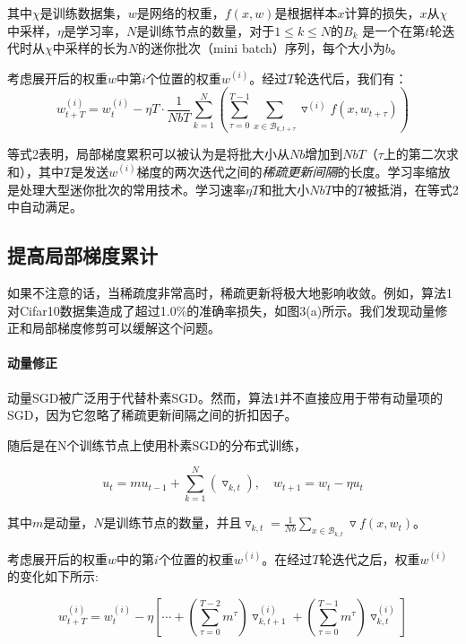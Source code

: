 其中$\chi$是训练数据集，$w$是网络的权重，$f(x,w)$是根据样本$x$计算的损失，$x$从$\chi$中采样，$\eta$是学习率，$N$是训练节点的数量，对于$1 \leq k \le N$的$B_k$ 是一个在第$t$轮迭代时从$\chi$中采样的长为$N$的迷你批次（mini batch）序列，每个大小为$b$。

考虑展开后的权重$w$中第$i$个位置的权重$w^{(i)}$。经过$T$轮迭代后，我们有：
\begin{equation}
	\label{eq:titer}
	w_{t+T}^{(i)} = w_{t}^{(i)} - \eta T \cdot \frac{1}{NbT} \sum_{k=1}^{N} \left (\sum_{\tau=0}^{T-1}\sum_{x \in \mathcal{B}_{k, t+\tau}} \triangledown^{(i)} f(x, w_{t+\tau}) \right ) 
\end{equation}

等式2表明，局部梯度累积可以被认为是将批大小从$Nb$增加到$NbT$（$\tau$上的第二次求和），其中$T$是发送$w^{(i)}$梯度的两次迭代之间的\emph{稀疏更新间隔}的长度。学习率缩放是处理大型迷你批次的常用技术。学习速率$\eta T$和批大小$NbT$中的$T$被抵消，在等式2中自动满足。

\subsection{提高局部梯度累计}
如果不注意的话，当稀疏度非常高时，稀疏更新将极大地影响收敛。例如，算法1对Cifar10数据集造成了超过1.0\%的准确率损失，如图3(a)所示。我们发现动量修正和局部梯度修剪可以缓解这个问题。

\paragraph{动量修正}
动量SGD被广泛用于代替朴素SGD。然而，算法1并不直接应用于带有动量项的SGD，因为它忽略了稀疏更新间隔之间的折扣因子。

随后是在N个训练节点上使用朴素SGD的分布式训练，

\begin{equation}
	\label{eq:msgd}
	u_{t} = mu_{t-1} + \sum_{k=1}^{N}\left( \triangledown_{k,t}\right),\quad  w_{t+1} = w_{t} - \eta u_{t}
\end{equation}

其中$m$是动量，$N$是训练节点的数量，并且$\triangledown_{k,t} =  \frac{1}{Nb} \sum_{x \in \mathcal{B}_{k, t}} \triangledown f(x, w_{t})$。

考虑展开后的权重$w$中的第$i$个位置的权重$w^{(i)}$。在经过$T$轮迭代之后，权重$w^{(i)}$的变化如下所示:

\begin{equation}
	\label{eq:msgd_change}
	w_{t+T}^{(i)} = w_{t}^{(i)} - \eta \left[\cdots +  \left( \sum_{\tau=0}^{T-2} m^{\tau}\right)\triangledown^{(i)}_{k,t+1} + \left( \sum_{\tau=0}^{T-1} m^{\tau}\right)\triangledown^{(i)}_{k,t}\right]
\end{equation}

